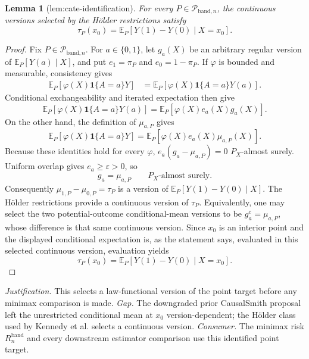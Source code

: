 \documentclass{article}
\newtheorem{lemma}{Lemma}
\begin{document}
\begin{lemma}[lem:cate-identification]\label{lem:cate-identification}
For every \(P\in\mathcal{P}_{\mathrm{band},n}\), the continuous versions selected by the H\"older restrictions satisfy \[\tau_P(x_0)=\mathbb{E}_P[Y(1)-Y(0)\mid X=x_0].\]
\end{lemma}
\begin{proof}
Fix \(P\in\mathcal P_{\mathrm{band},n}\).  For \(a\in\{0,1\}\), let
\(g_a(X)\) be an arbitrary regular version of
\(\mathbb E_P[Y(a)\mid X]\), and put \(e_1=\pi_P\) and
\(e_0=1-\pi_P\).  If \(\varphi\) is bounded and measurable, consistency gives
\[
\begin{aligned}
\mathbb E_P[\varphi(X)\mathbf 1\{A=a\}Y]
&=\mathbb E_P[\varphi(X)\mathbf 1\{A=a\}Y(a)] .
\end{aligned}
\]
Conditional exchangeability and iterated expectation then give
\[
\mathbb E_P[\varphi(X)\mathbf 1\{A=a\}Y(a)]
=\mathbb E_P[\varphi(X)e_a(X)g_a(X)].
\]
On the other hand, the definition of \(\mu_{a,P}\) gives
\[
\mathbb E_P[\varphi(X)\mathbf 1\{A=a\}Y]
=\mathbb E_P[\varphi(X)e_a(X)\mu_{a,P}(X)].
\]
Because these identities hold for every \(\varphi\),
\(e_a(g_a-\mu_{a,P})=0\) \(P_X\)-almost surely.  Uniform overlap gives
\(e_a\geq\varepsilon>0\), so
\[
g_a=\mu_{a,P}\qquad P_X\text{-almost surely}.
\]
Consequently \(\mu_{1,P}-\mu_{0,P}=\tau_P\) is a version of
\(\mathbb E_P[Y(1)-Y(0)\mid X]\).  The H\"older restrictions provide a
continuous version of \(\tau_P\).  Equivalently, one may select the two
potential-outcome conditional-mean versions to be
\(g_a^{\mathrm c}=\mu_{a,P}\), whose difference is that same continuous
version.  Since \(x_0\) is an interior point and the displayed conditional
expectation is, as the statement says, evaluated in this selected continuous
version, evaluation yields
\[
\tau_P(x_0)=\mathbb E_P[Y(1)-Y(0)\mid X=x_0].
\]
\end{proof}
\par\smallskip\noindent \textit{Justification.} This selects a law-functional version of the point target before any minimax comparison is made. \textit{Gap.} The downgraded prior CausalSmith proposal left the unrestricted conditional mean at \(x_0\) version-dependent; the H\"older class used by Kennedy et al. selects a continuous version. \textit{Consumer.} The minimax risk \(R_n^{\mathrm{band}}\) and every downstream estimator comparison use this identified point target.
\end{document}
